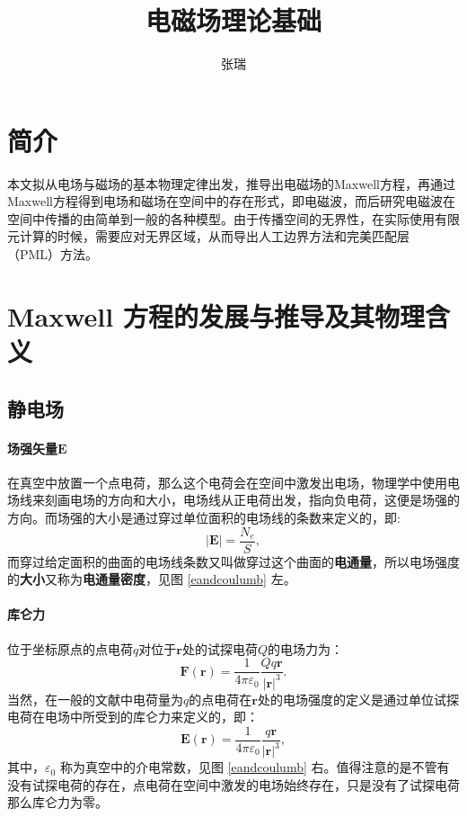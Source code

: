 \documentclass[10pt,reqno, final]{ctexart}
\begin{document}
\title{电磁场理论基础}
\author{张\quad 瑞}
\maketitle
\section{简介}
本文拟从电场与磁场的基本物理定律出发，推导出电磁场的Maxwell方程，再通过Maxwell方程得到电场和磁场在空间中的存在形式，即电磁波，而后研究电磁波在空间中传播的由简单到一般的各种模型。由于传播空间的无界性，在实际使用有限元计算的时候，需要应对无界区域，从而导出人工边界方法和完美匹配层 （PML）方法。

\section{Maxwell 方程的发展与推导及其物理含义}
\subsection{静电场}
\paragraph{场强矢量$\bm{E}$}在真空中放置一个点电荷，那么这个电荷会在空间中激发出电场，物理学中使用电场线来刻画电场的方向和大小，电场线从正电荷出发，指向负电荷，这便是场强的方向。而场强的大小是通过穿过单位面积的电场线的条数来定义的，即:
\begin{equation}\label{electricfield}
|\bm{E}|=\frac{N_e}{S},
\end{equation}
而穿过给定面积的曲面的电场线条数又叫做穿过这个曲面的\textbf{电通量}，所以电场强度的\textbf{大小}又称为\textbf{电通量密度}，见图 \ref{eandcoulumb} 左。
\paragraph{库仑力}位于坐标原点的点电荷$q$对位于$\bm{r}$处的试探电荷$Q$的电场力为：
\begin{equation}\label{coulombforce}
\bm{F}(\bm{r}) = \frac{1}{4\pi\varepsilon_0}\frac{Qq\bm{r}}{|\bm{r}|^3}.
\end{equation}
当然，在一般的文献中电荷量为$q$的点电荷在$\bm{r}$处的电场强度的定义是通过单位试探电荷在电场中所受到的库仑力来定义的，即：
\begin{equation}\label{columb}
\bm{E}(\bm{r})=\frac{1}{4\pi\varepsilon_0}\frac{q\bm{r}}{|\bm{r}|^3},
\end{equation}
其中，$\varepsilon_0$ 称为真空中的介电常数，见图 \ref{eandcoulumb} 右。值得注意的是不管有没有试探电荷的存在，点电荷在空间中激发的电场始终存在，只是没有了试探电荷那么库仑力为零。
\end{document}
